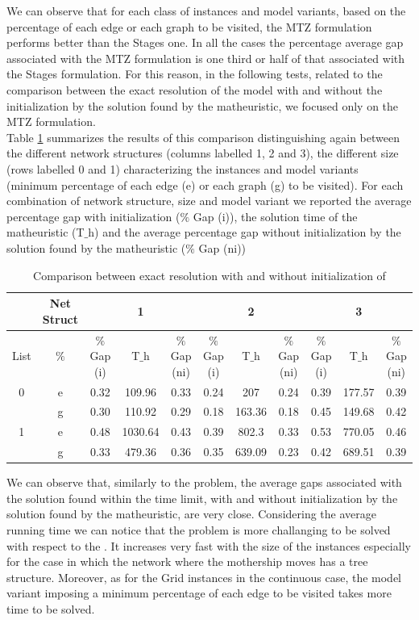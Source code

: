 \noindent
We can observe that for each class of instances and model variants, based on the percentage of each edge or each graph to be visited, the MTZ formulation performs better than the Stages one. In all the cases the percentage average gap associated with the MTZ formulation is one third or half of that associated with the Stages formulation. For this reason, in the following tests, related to the comparison between the exact resolution of the \NMD\xspace  model with and without the initialization by the solution found by the matheuristic, we focused only on the MTZ formulation.\\
Table \ref{table:tab6} summarizes the results of this comparison distinguishing again between the different network structures (columns labelled 1, 2 and 3), the different size (rows labelled 0 and 1) characterizing the instances and model variants (minimum percentage of each edge (e) or each graph (g) to be visited). For each combination of network structure, size and model variant we reported the average percentage gap with initialization ($\%$ Gap (i)), the solution time of the matheuristic (T$\_$h) and the average percentage gap without initialization by the solution found by the matheuristic ($\%$ Gap (ni))

\renewcommand{\arraystretch}{0.8}
\begin{table}[!h]
\caption{Comparison between exact resolution with and without initialization of \NMD}
\centering
\tiny
\begin{tabular}{c c | c c c | c c c | c c c}
\hline
 & Net Struct  & \multicolumn{3}{c}{1} &  \multicolumn{3}{c}{2}  & \multicolumn{3}{c}{3}\\
\hline
List &  $\%$  & $\%$ Gap (i) & T$\_$h & $\%$ Gap (ni)  & $\%$ Gap (i) & T$\_$h &  $\%$ Gap (ni) & $\%$ Gap (i) & T$\_$h &  $\%$ Gap (ni)\\
\hline
\multirow{}{}{0} & e & 0.32 & 109.96 & 0.33 & 0.24 & 207 & 0.24 & 0.39 & 177.57 & 0.39\\
& g & 0.30 & 110.92 & 0.29 & 0.18 & 163.36 & 0.18 & 0.45 & 149.68 & 0.42\\
\hline
\multirow{}{}{1} & e & 0.48 & 1030.64 & 0.43 & 0.39 & 802.3 & 0.33 & 0.53 & 770.05 & 0.46\\
& g & 0.33 & 479.36 & 0.36 & 0.35 & 639.09 & 0.23 & 0.42 & 689.51 & 0.39\\
\hline
\end{tabular}
\label{table:tab6}
\end{table}

\noindent
We can observe that, similarly to the \AMD\xspace problem, the average gaps associated with the solution found within the time limit, with and without initialization by the solution found by the matheuristic, are very close. Considering the average running time we can notice that the \NMD\xspace  problem is more challanging to be solved with respect to the \AMD. It increases very fast with the size of the instances especially for the case in which the network where the mothership moves has a tree structure. Moreover, as for the Grid instances in the continuous case, the model variant imposing a minimum percentage of each edge to be visited takes more time to be solved.

